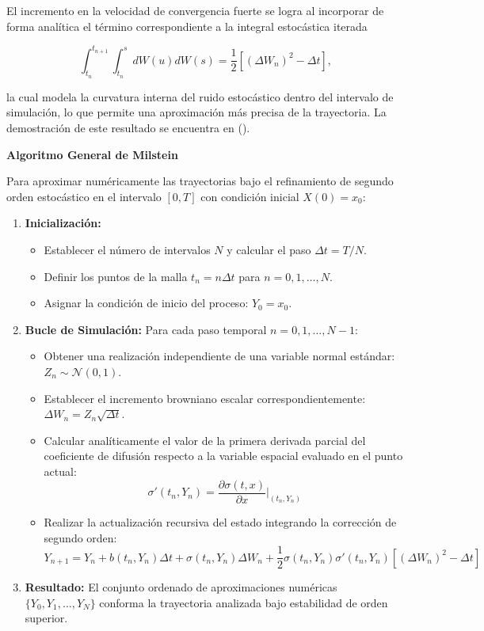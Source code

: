 \documentclass[
  spanish,
  letterpaper,
  DIV=11,
  numbers=noendperiod]{scrreprt}
\providecommand{\tightlist}{%
  \setlength{\itemsep}{0pt}\setlength{\parskip}{0pt}}
\theoremstyle{plain}
\theoremstyle{definition}
\theoremstyle{remark}
\begin{document}
El incremento en la velocidad de convergencia fuerte se logra al
incorporar de forma analítica el término correspondiente a la integral
estocástica iterada

\[
\int_{t_n}^{t_{n+1}} \int_{t_n}^s dW(u) dW(s) = \frac{1}{2} \left[ (\Delta W_n)^2 - \Delta t \right],
\]

la cual modela la curvatura interna del ruido estocástico dentro del
intervalo de simulación, lo que permite una aproximación más precisa de
la trayectoria. La demostración de este resultado se encuentra en
().

\textbf{Algoritmo General de Milstein}

Para aproximar numéricamente las trayectorias bajo el refinamiento de
segundo orden estocástico en el intervalo \([0, T]\) con condición
inicial \(X(0) = x_0\):

\begin{enumerate}
\def\labelenumi{\arabic{enumi}.}
\tightlist
\item
  \textbf{Inicialización:}

  \begin{itemize}
  \tightlist
  \item
    Establecer el número de intervalos \(N\) y calcular el paso
    \(\Delta t = T/N\).
  \item
    Definir los puntos de la malla \(t_n = n \Delta t\) para
    \(n = 0, 1, \dots, N\).
  \item
    Asignar la condición de inicio del proceso: \(Y_0 = x_0\).
  \end{itemize}
\item
  \textbf{Bucle de Simulación:} Para cada paso temporal
  \(n = 0, 1, \dots, N-1\):

  \begin{itemize}
  \tightlist
  \item
    Obtener una realización independiente de una variable normal
    estándar: \(Z_n \sim \mathcal{N}(0, 1)\).
  \item
    Establecer el incremento browniano escalar correspondientemente:
    \(\Delta W_n = Z_n \sqrt{\Delta t}\).
  \item
    Calcular analíticamente el valor de la primera derivada parcial del
    coeficiente de difusión respecto a la variable espacial evaluado en
    el punto actual:
    \[\sigma'(t_n, Y_n) = \frac{\partial \sigma(t, x)}{\partial x} \bigg|_{(t_n, Y_n)}\]
  \item
    Realizar la actualización recursiva del estado integrando la
    corrección de segundo orden:
    \[Y_{n+1} = Y_n + b(t_n, Y_n)\Delta t + \sigma(t_n, Y_n)\Delta W_n + \frac{1}{2}\sigma(t_n, Y_n)\sigma'(t_n, Y_n)\left[(\Delta W_n)^2 - \Delta t\right]\]
  \end{itemize}
\item
  \textbf{Resultado:} El conjunto ordenado de aproximaciones numéricas
  \(\{Y_0, Y_1, \dots, Y_N\}\) conforma la trayectoria analizada bajo
  estabilidad de orden superior.
\end{enumerate}
\end{document}
